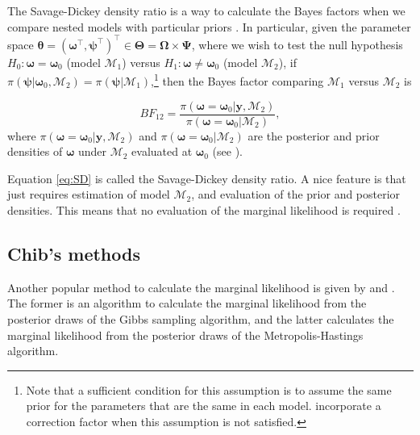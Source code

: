The Savage-Dickey density ratio is a way to calculate the Bayes factors when we compare nested models with particular priors \cite{dickey1971weighted,verdinelli1995computing}. In particular, given the parameter space $\bm{\theta}=(\bm{\omega}^{\top}, \bm{\psi}^{\top})^{\top}\in \bm{\Theta}=\bm{\Omega}\times \bm{\Psi}$, where we wish to test the null hypothesis $H_0:\bm{\omega}=\bm{\omega}_0$ (model $\mathcal{M}_1$) versus $H_1:\bm{\omega}\neq \bm{\omega}_0$ (model $\mathcal{M}_2$), if $\pi(\bm{\psi}|\bm{\omega}_0,\mathcal{M}_2)=\pi(\bm{\psi}|\mathcal{M}_1)$,\footnote{Note that a sufficient condition for this assumption is to assume the same prior for the parameters that are the same in each model. \cite{verdinelli1995computing} incorporate a correction factor when this assumption is not satisfied.} then the Bayes factor comparing $\mathcal{M}_1$ versus $\mathcal{M}_2$ is

\begin{equation}\label{eq:SD}
	BF_{12}=\frac{\pi(\bm{\omega}=\bm{\omega}_0|\bm{y},\mathcal{M}_2)}{\pi(\bm{\omega}=\bm{\omega}_0|\mathcal{M}_2)},
\end{equation}
where $\pi(\bm{\omega}=\bm{\omega}_0|\bm{y},\mathcal{M}_2)$ and $\pi(\bm{\omega}=\bm{\omega}_0|\mathcal{M}_2)$ are the posterior and prior densities of $\bm{\omega}$ under $\mathcal{M}_2$ evaluated at $\bm{\omega}_0$ (see \cite{verdinelli1995computing}). 

Equation \ref{eq:SD} is called the Savage-Dickey density ratio. A nice feature is that just requires estimation of model $\mathcal{M}_2$, and evaluation of the prior and posterior densities. This means that no evaluation of the marginal likelihood is required \cite[Chap.~4]{koop2003bayesian}.\\

\subsection{Chib's methods}\label{sec10_4_2}

Another popular method to calculate the marginal likelihood is given by \cite{chib1995marginal} and \cite{chib2001marginal}. The former is an algorithm to calculate the marginal likelihood from the posterior draws of the Gibbs sampling algorithm, and the latter calculates the marginal likelihood from the posterior draws of the Metropolis-Hastings algorithm.

